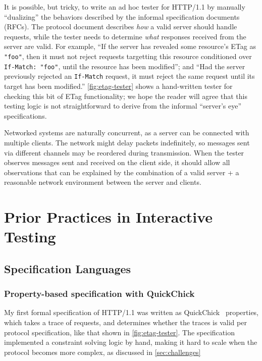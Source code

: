\documentclass[12pt,oneside]{amsbook}
\newcommand{\http}{HTTP/1.1\xspace}
\newcommand{\inlinec}[1]{\lstinline[style=customc]{#1}}
\numberwithin{section}{chapter}
\numberwithin{figure}{chapter}
\numberwithin{equation}{chapter}
\begin{document}
It is possible, but tricky, to write an ad hoc tester for \http by manually
``dualizing'' the behaviors described by the informal specification documents
(RFCs).  The protocol document describes {\em how} a valid server should handle
requests, while the tester needs to determine {\em what} responses received from
the server are valid.  For example, ``If the server has revealed some resource's
ETag as \inlinec{"foo"}, then it must not reject requests targetting this
resource conditioned over \inlinec{If-Match: "foo"}, until the resource has been
modified''; and ``Had the server previously rejected an \inlinec{If-Match}
request, it must reject the same request until its target has been modified.''
\autoref{fig:etag-tester} shows a hand-written tester for checking this bit of
ETag functionality; we hope the reader will agree that this testing logic is not
straightforward to derive from the informal ``server's eye'' specifications.

Networked systems are naturally concurrent, as a server can be connected with
multiple clients.  The network might delay packets indefinitely, so messages
sent via different channels may be reordered during transmission.  When the
tester observes messages sent and received on the client side, it should allow
all observations that can be explained by the combination of a valid server + a
reasonable network environment between the server and clients.

\chapter{Prior Practices in Interactive Testing}
\label{chap:practices}
\section{Specification Languages}

\subsection{Property-based specification with QuickChick}
My first formal specification of \http was written as
QuickChick~\cite{quickchick} properties, which takes a trace of requests, and
determines whether the traces is valid per protocol specification, like that
shown in \autoref{fig:etag-tester}.  The specification implemented a constraint
solving logic by hand, making it hard to scale when the protocol becomes more
complex, as discussed in \autoref{sec:challenges}
\end{document}
